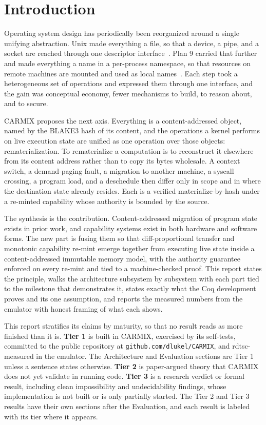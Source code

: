 \documentclass[10pt,twocolumn]{article}
\newcommand{\carmix}{CARMIX}
\begin{document}
\section{Introduction}

Operating system design has periodically been reorganized around a single
unifying abstraction. Unix made everything a file, so that a device, a pipe, and
a socket are reached through one descriptor interface~\cite{ritchie1974unix}.
Plan 9 carried that further and made everything a name in a per-process
namespace, so that resources on remote machines are mounted and used as local
names~\cite{pike1995plan9}. Each step took a heterogeneous set of operations and
expressed them through one interface, and the gain was conceptual economy, fewer
mechanisms to build, to reason about, and to secure.

\carmix{} proposes the next axis. Everything is a content-addressed object,
named by the BLAKE3 hash of its content, and the operations a kernel performs on
live execution state are unified as one operation over those objects:
rematerialization. To rematerialize a computation is to reconstruct it elsewhere
from its content address rather than to copy its bytes wholesale. A context
switch, a demand-paging fault, a migration to another machine, a syscall
crossing, a program load, and a deschedule then differ only in scope and in
where the destination state already resides. Each is a verified materialize-by-hash
under a re-minted capability whose authority is bounded by the source.

The synthesis is the contribution. Content-addressed migration of program state
exists in prior work, and capability systems exist in both hardware and software
forms. The new part is fusing them so that diff-proportional transfer and
monotonic capability re-mint emerge together from executing live state inside a
content-addressed immutable memory model, with the authority guarantee enforced
on every re-mint and tied to a machine-checked proof. This report states the
principle, walks the architecture subsystem by subsystem with each part tied to
the milestone that demonstrates it, states exactly what the Coq development
proves and its one assumption, and reports the measured numbers from the
emulator with honest framing of what each shows.

This report stratifies its claims by maturity, so that no result reads as more
finished than it is. \textbf{Tier 1} is built in \carmix{}, exercised by its
self-tests, committed to the public repository at
\texttt{github.com/dlukel/CARMIX}, and rdtsc-measured in the emulator. The
Architecture and Evaluation sections are Tier 1 unless a sentence states
otherwise. \textbf{Tier 2} is paper-argued theory that \carmix{} does not yet validate
in running code. \textbf{Tier 3} is a research verdict or formal result,
including clean impossibility and undecidability findings, whose implementation
is not built or is only partially started. The Tier 2 and Tier 3 results have
their own sections after the Evaluation, and each result is labeled with its tier
where it appears.
\end{document}
